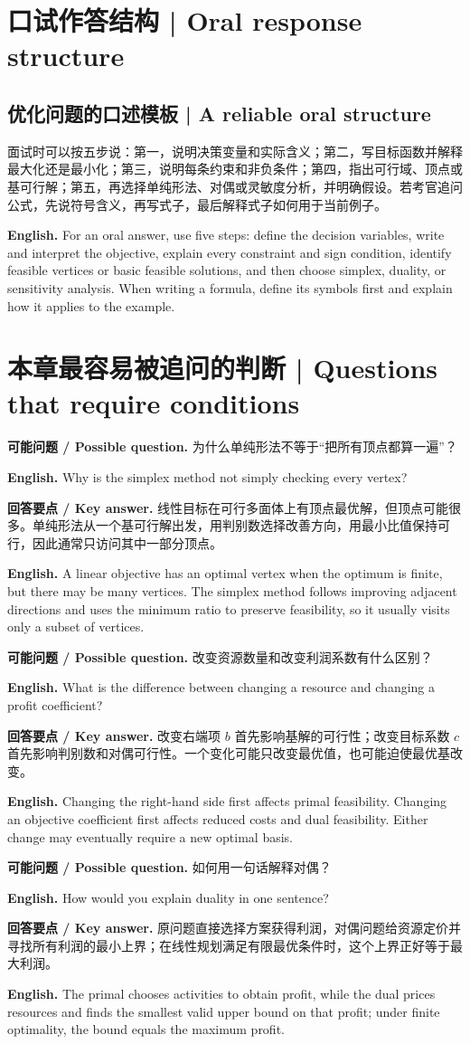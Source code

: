 \documentclass[UTF8,11pt,a4paper]{ctexart}
\newcommand{\EN}[1]{\par\noindent \textbf{English.} #1\par}
\newcommand{\ASK}[4]{\par\noindent \textbf{可能问题 / Possible question.} #1\par\EN{#2}\noindent \textbf{回答要点 / Key answer.} #3\par\EN{#4}\medskip}
\begin{document}
\clearpage
\section{口试作答结构 | Oral response structure}
\subsection{优化问题的口述模板 | A reliable oral structure}
\noindent 面试时可以按五步说：第一，说明决策变量和实际含义；第二，写目标函数并解释最大化还是最小化；第三，说明每条约束和非负条件；第四，指出可行域、顶点或基可行解；第五，再选择单纯形法、对偶或灵敏度分析，并明确假设。若考官追问公式，先说符号含义，再写式子，最后解释式子如何用于当前例子。
\EN{For an oral answer, use five steps: define the decision variables, write and interpret the objective, explain every constraint and sign condition, identify feasible vertices or basic feasible solutions, and then choose simplex, duality, or sensitivity analysis. When writing a formula, define its symbols first and explain how it applies to the example.}



\section{本章最容易被追问的判断 | Questions that require conditions}
\ASK{为什么单纯形法不等于“把所有顶点都算一遍”？}{Why is the simplex method not simply checking every vertex?}{线性目标在可行多面体上有顶点最优解，但顶点可能很多。单纯形法从一个基可行解出发，用判别数选择改善方向，用最小比值保持可行，因此通常只访问其中一部分顶点。}{A linear objective has an optimal vertex when the optimum is finite, but there may be many vertices. The simplex method follows improving adjacent directions and uses the minimum ratio to preserve feasibility, so it usually visits only a subset of vertices.}
\ASK{改变资源数量和改变利润系数有什么区别？}{What is the difference between changing a resource and changing a profit coefficient?}{改变右端项 $b$ 首先影响基解的可行性；改变目标系数 $c$ 首先影响判别数和对偶可行性。一个变化可能只改变最优值，也可能迫使最优基改变。}{Changing the right-hand side first affects primal feasibility. Changing an objective coefficient first affects reduced costs and dual feasibility. Either change may eventually require a new optimal basis.}
\ASK{如何用一句话解释对偶？}{How would you explain duality in one sentence?}{原问题直接选择方案获得利润，对偶问题给资源定价并寻找所有利润的最小上界；在线性规划满足有限最优条件时，这个上界正好等于最大利润。}{The primal chooses activities to obtain profit, while the dual prices resources and finds the smallest valid upper bound on that profit; under finite optimality, the bound equals the maximum profit.}
\end{document}
